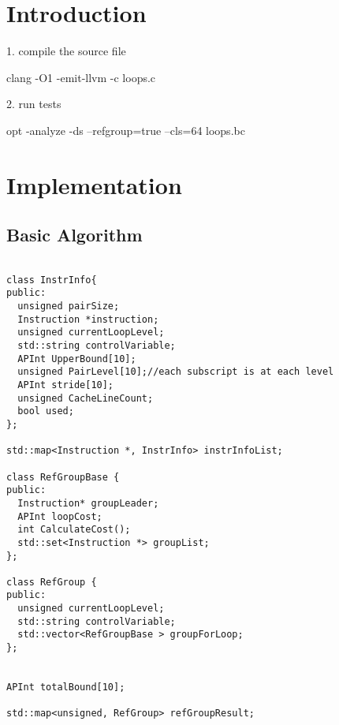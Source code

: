 


\label{Chapter1} %



\section{Introduction}

1. compile  the source file

clang -O1 -emit-llvm -c loops.c 

2. run tests   

opt -analyze -ds --refgroup=true --cls=64 loops.bc

\section{Implementation}
\subsection{Basic Algorithm}
\begin{lstlisting}

class InstrInfo{
public:
  unsigned pairSize;
  Instruction *instruction;
  unsigned currentLoopLevel;
  std::string controlVariable;
  APInt UpperBound[10];
  unsigned PairLevel[10];//each subscript is at each level
  APInt stride[10];  
  unsigned CacheLineCount;
  bool used;
};
  
std::map<Instruction *, InstrInfo> instrInfoList;

class RefGroupBase {
public:
  Instruction* groupLeader;
  APInt loopCost;
  int CalculateCost();
  std::set<Instruction *> groupList;
};

class RefGroup {
public:
  unsigned currentLoopLevel;
  std::string controlVariable;
  std::vector<RefGroupBase > groupForLoop;
};


APInt totalBound[10];

std::map<unsigned, RefGroup> refGroupResult;

\end{lstlisting}


